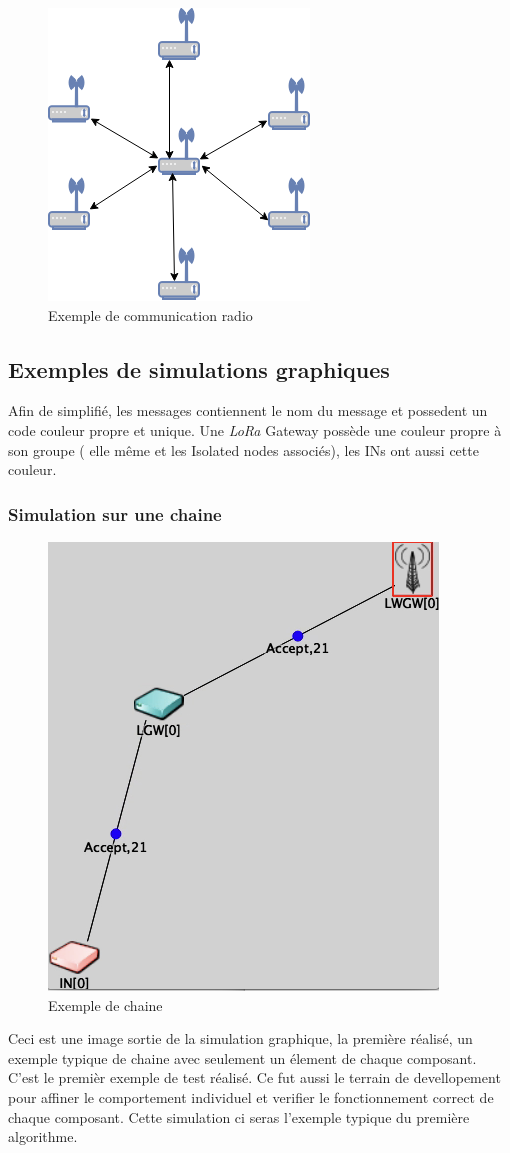 \documentclass[11pt]{article}
\begin{document}
\begin{figure}[!ht]
\centering
\includegraphics[scale=1]{ex_radio.png} 
\caption{Exemple de communication radio}
\end{figure}


\newpage
\subsection{Exemples de simulations graphiques}
Afin de simplifié, les messages contiennent le nom du message et possedent un code couleur propre et unique. Une \textit{LoRa} Gateway possède une couleur propre à son groupe ( elle même et les Isolated nodes associés), les INs ont aussi cette couleur.
\subsubsection{Simulation sur une chaine}
\begin{figure}[!ht]
\centering
\includegraphics[scale=0.6]{chaine.png} 
\caption{Exemple de chaine}
\end{figure}
Ceci est une image sortie de la simulation graphique, la première réalisé, un exemple typique de chaine avec seulement un élement de chaque composant. C'est le premièr exemple de test réalisé. Ce fut aussi le terrain de devellopement pour affiner le comportement individuel et verifier le fonctionnement correct de chaque composant. Cette simulation ci seras l'exemple typique du première algorithme.
\newpage
\end{document}
